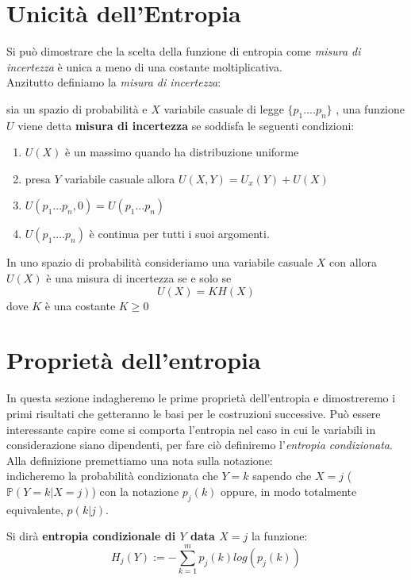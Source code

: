 \section{Unicità dell'Entropia}
\label{sec:UniEntropia}
Si può dimostrare che la scelta della funzione di entropia come \textit{misura di incertezza} è unica a meno di una costante moltiplicativa.\\
Anzitutto definiamo la \textit{misura di incertezza}:
\begin{defi} \label{defi:misuraincertezza}
sia \spacep un spazio di probabilità e $X$ variabile casuale di legge $\{ p_1....p_n \}$ , una funzione $U$ viene detta \textbf{misura di incertezza} se soddisfa le seguenti condizioni:
\begin{enumerate}
\item $U(X)$ è un massimo quando ha distribuzione uniforme
\item presa $Y$ variabile casuale allora $U(X,Y)=U_x(Y)+U(X)$
\item $U(p_1...p_n,0)=U(p_1...p_n)$
\item $U(p_1....p_n)$ è continua per tutti i suoi argomenti.
\end{enumerate}
\end{defi}

\begin{teo} \label{teo:misuraIncertezza}
In uno spazio di probabilità \spacep consideriamo una variabile casuale $X$ con \lep allora\\
$U(X)$ è una misura di incertezza se e solo se 
$$U(X)= KH(X)$$
dove $K$ è una costante $K\geq 0$
\end{teo}


\section{Proprietà dell'entropia}
\label{sec:PropriEntropia}
In questa sezione indagheremo le prime proprietà dell'entropia e dimostreremo i primi risultati che getteranno le basi per le costruzioni successive.
Può essere interessante capire come si comporta l'entropia nel caso in cui le variabili in considerazione siano dipendenti, per fare ciò definiremo l'\textit{entropia condizionata}. Alla definizione premettiamo una nota sulla notazione:\\
indicheremo la probabilità condizionata che $Y=k$ sapendo che $X=j$ ($\mathbb{P}(Y=k|X=j)$) con la notazione $p_{j}(k)$ oppure, in modo totalmente equivalente, $p(k|j)$.
\begin{defi} \label{defi:condiz}
Si dirà \textbf{entropia condizionale di $Y$ data $X=j$} la funzione: 
\begin{equation}\label{eq:6.6}
H_j(Y):=-\sum_{k=1}^m p_j(k)log(p_j(k))
\end{equation}
\end{defi}


